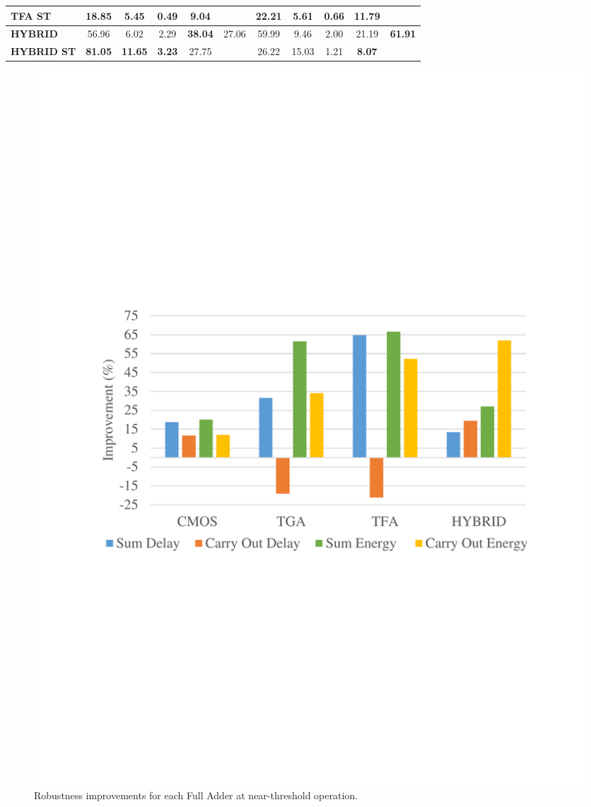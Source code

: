 \documentclass[ecp,tc, english]{iiufrgs}
\begin{document}
\begin{table}[!htbp]
{\begin{tabular}{lcccccccccc}
\textbf{TFA ST}                            & 18.85          & 5.45           & \textbf{0.49} & \textbf{9.04}  &                                 & \textbf{22.21} & 5.61           & 0.66          & 11.79          &                                 \\ \hline
\textbf{HYBRID}                            & 56.96          & 6.02           & 2.29          & \textbf{38.04} & \multirow{2}{*}{27.06}          & 59.99          & 9.46           & 2.00          & 21.19          & \multirow{2}{*}{\textbf{61.91}} \\ \cline{1-5} \cline{7-10}
\textbf{HYBRID ST}                         & \textbf{81.05} & \textbf{11.65} & \textbf{3.23} & 27.75          &                                 & 26.22          & 15.03          & 1.21          & \textbf{8.07}  &                                 \\ \hline
\end{tabular}%
}
\end{table}

\begin{figure}[!htb]
\centering
\includegraphics[width=\textwidth, trim={0 9cm 0 9cm},clip]{improvNT.pdf}
\caption{Robustness improvements for each Full Adder at near-threshold operation.}
\label{fig:NTimprov}
\end{figure}
\end{document}
